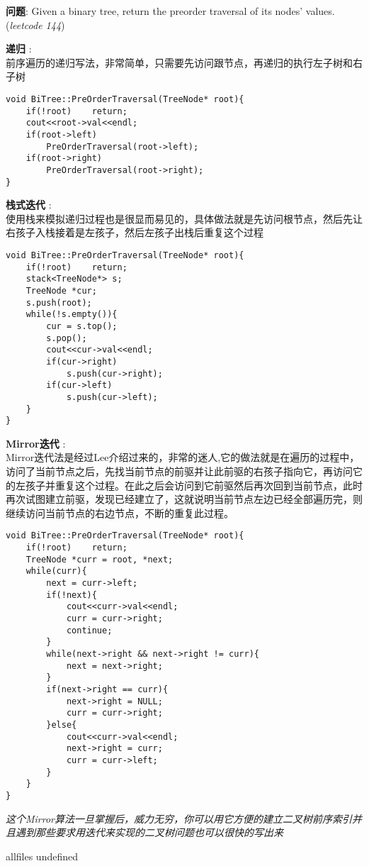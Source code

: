 \documentclass{article}
\begin{document}
\begin{CJK}{UTF8}{gbsn}     %

\else
    
\begin{description}
    \item{\textbf{问题}}: Given a binary tree, return the preorder traversal of its nodes' values.(\textit{leetcode 144})
    \item{\textbf{递归}} : 
    \\前序遍历的递归写法，非常简单，只需要先访问跟节点，再递归的执行左子树和右子树
    \begin{lstlisting}
void BiTree::PreOrderTraversal(TreeNode* root){
    if(!root)    return;
    cout<<root->val<<endl;
    if(root->left)
        PreOrderTraversal(root->left);
    if(root->right)
        PreOrderTraversal(root->right);
}
    \end{lstlisting}
    \item{\textbf{栈式迭代}} : 
    \\使用栈来模拟递归过程也是很显而易见的，具体做法就是先访问根节点，然后先让右孩子入栈接着是左孩子，然后左孩子出栈后重复这个过程
    \begin{lstlisting}
void BiTree::PreOrderTraversal(TreeNode* root){
    if(!root)    return;
    stack<TreeNode*> s;
    TreeNode *cur;
    s.push(root);
    while(!s.empty()){
        cur = s.top();
        s.pop();
        cout<<cur->val<<endl;
        if(cur->right)
            s.push(cur->right);
        if(cur->left)
            s.push(cur->left);
    }
}
    \end{lstlisting}
    \item{\textbf{Mirror迭代}} : 
    \\Mirror迭代法是经过Lee介绍过来的，非常的迷人,它的做法就是在遍历的过程中，访问了当前节点之后，先找当前节点的前驱并让此前驱的右孩子指向它，再访问它的左孩子并重复这个过程。在此之后会访问到它前驱然后再次回到当前节点，此时再次试图建立前驱，发现已经建立了，这就说明当前节点左边已经全部遍历完，则继续访问当前节点的右边节点，不断的重复此过程。
    \begin{lstlisting}
void BiTree::PreOrderTraversal(TreeNode* root){
    if(!root)    return;
    TreeNode *curr = root, *next;
    while(curr){
        next = curr->left;
        if(!next){
            cout<<curr->val<<endl;
            curr = curr->right;
            continue;
        }
        while(next->right && next->right != curr){
            next = next->right;
        }
        if(next->right == curr){
            next->right = NULL;
            curr = curr->right;
        }else{
            cout<<curr->val<<endl;
            next->right = curr;
            curr = curr->left;
        }
    }
}
    \end{lstlisting}
    \textit{这个Mirror算法一旦掌握后，威力无穷，你可以用它方便的建立二叉树前序索引并且遇到那些要求用迭代来实现的二叉树问题也可以很快的写出来}
\end{description}

\fi

\ifx allfiles undefined
\end{CJK}
\end{document}
